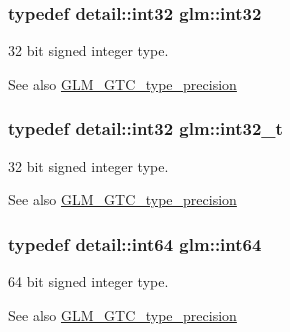 \subsubsection[{int32}]{\setlength{\rightskip}{0pt plus 5cm}typedef detail\+::int32 {\bf glm\+::int32}}\label{group__gtc__type__precision_ga632d8b25f6b61659f39ea4321fab92a4}
32 bit signed integer type. \begin{DoxySeeAlso}{See also}
\hyperlink{group__gtc__type__precision}{G\+L\+M\+\_\+\+G\+T\+C\+\_\+type\+\_\+precision} 
\end{DoxySeeAlso}
\hypertarget{group__gtc__type__precision_gab870c0eb6f525b0c8c4716762e0fc3a8}{}
\subsubsection[{int32\+\_\+t}]{\setlength{\rightskip}{0pt plus 5cm}typedef detail\+::int32 {\bf glm\+::int32\+\_\+t}}\label{group__gtc__type__precision_gab870c0eb6f525b0c8c4716762e0fc3a8}
32 bit signed integer type. \begin{DoxySeeAlso}{See also}
\hyperlink{group__gtc__type__precision}{G\+L\+M\+\_\+\+G\+T\+C\+\_\+type\+\_\+precision} 
\end{DoxySeeAlso}
\hypertarget{group__gtc__type__precision_ga435d75819cce297cc5fa21bd84ef89a5}{}
\subsubsection[{int64}]{\setlength{\rightskip}{0pt plus 5cm}typedef detail\+::int64 {\bf glm\+::int64}}\label{group__gtc__type__precision_ga435d75819cce297cc5fa21bd84ef89a5}
64 bit signed integer type. \begin{DoxySeeAlso}{See also}
\hyperlink{group__gtc__type__precision}{G\+L\+M\+\_\+\+G\+T\+C\+\_\+type\+\_\+precision} 
\end{DoxySeeAlso}
\hypertarget{group__gtc__type__precision_ga6abb23fbf4e39c50ec5341160b5da5ab}{}
